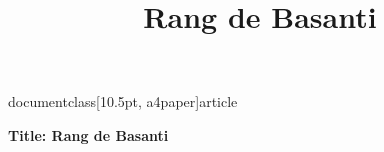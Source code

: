 
documentclass[10.5pt, a4paper]{article}
\usepackage{amsfonts}
\usepackage[top=1in,left=1in,right=1in]{geometry}
\usepackage{times}
\usepackage{tabularx}
\title{Rang de Basanti}

\maketitle
\textbf{Title: Rang de Basanti}

